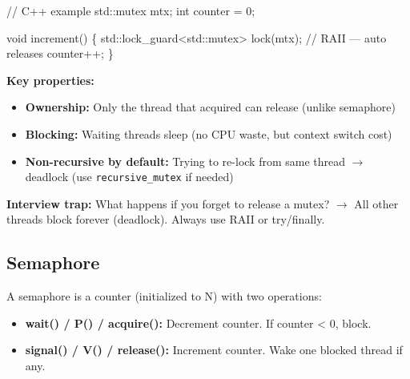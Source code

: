 \documentclass[11pt]{article}
\providecommand{\tightlist}{\setlength{\itemsep}{1pt}\setlength{\parskip}{0pt}}
\newenvironment{Shaded}{\begin{snugshade}}{\end{snugshade}}
\newcommand{\BuiltInTok}[1]{\textcolor[rgb]{0.50,0.55,0.55}{#1}}
\newcommand{\CommentTok}[1]{\textcolor[rgb]{0.48,0.49,0.49}{#1}}
\newcommand{\DataTypeTok}[1]{\textcolor[rgb]{0.16,0.50,0.73}{#1}}
\newcommand{\DecValTok}[1]{\textcolor[rgb]{0.96,0.45,0.00}{#1}}
\newcommand{\NormalTok}[1]{\textcolor[rgb]{0.81,0.81,0.76}{#1}}
\newcommand{\OperatorTok}[1]{\textcolor[rgb]{0.81,0.81,0.76}{#1}}
\begin{document}

\begin{Shaded}
\begin{Highlighting}[]
\CommentTok{// C++ example}
\BuiltInTok{std::}\NormalTok{mutex mtx}\OperatorTok{;}
\DataTypeTok{int}\NormalTok{ counter }\OperatorTok{=} \DecValTok{0}\OperatorTok{;}

\DataTypeTok{void}\NormalTok{ increment}\OperatorTok{()} \OperatorTok{\{}
    \BuiltInTok{std::}\NormalTok{lock\_guard}\OperatorTok{\textless{}}\BuiltInTok{std::}\NormalTok{mutex}\OperatorTok{\textgreater{}}\NormalTok{ lock}\OperatorTok{(}\NormalTok{mtx}\OperatorTok{);}  \CommentTok{// RAII — auto releases}
\NormalTok{    counter}\OperatorTok{++;}
\OperatorTok{\}}
\end{Highlighting}
\end{Shaded}

\textbf{Key properties:}

\begin{itemize}
\tightlist
\item
  \textbf{Ownership:} Only the thread that acquired can release (unlike semaphore)
\item
  \textbf{Blocking:} Waiting threads sleep (no CPU waste, but context switch cost)
\item
  \textbf{Non-recursive by default:} Trying to re-lock from same thread \(\rightarrow\) deadlock (use \texttt{recursive\_mutex} if needed)
\end{itemize}

\textbf{Interview trap:} What happens if you forget to release a mutex? \(\rightarrow\) All other threads block forever (deadlock). Always use RAII or try/finally.

\subsection{Semaphore}\label{semaphore}

A semaphore is a counter (initialized to N) with two operations:

\begin{itemize}
\tightlist
\item
  \textbf{wait() / P() / acquire():} Decrement counter. If counter \textless{} 0, block.
\item
  \textbf{signal() / V() / release():} Increment counter. Wake one blocked thread if any.
\end{itemize}

\end{document}
